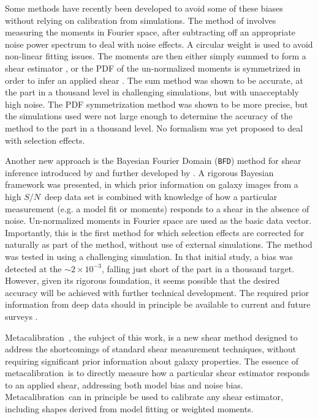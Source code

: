 \documentclass[iop]{emulateapj}
\newcommand{\snr}{$S/N$}
\newcommand{\mcal}{metacalibration}
\newcommand{\Mcal}{Metacalibration}
\newcommand{\bfd}{\texttt{BFD}}
\begin{document}
Some methods have recently been developed to avoid some of these biases without
relying on calibration from simulations.  The method of \citep{Zhang2017}
involves measuring the moments in Fourier space, after subtracting off an
appropriate noise power spectrum to deal with noise effects.  A circular weight
is used to avoid non-linear fitting issues.  The moments are then either simply
summed to form a shear estimator \citep{Zhang2015}, or the PDF of the
un-normalized moments is symmetrized in order to infer an applied shear
\citep{Zhang2017}.  The sum method was shown to be accurate, at the part in a
thousand level in challenging simulations, but with unacceptably high noise.
The PDF symmetrization method was shown to be more precise, but the simulations
used were not large enough to determine the accuracy of the method to the part
in a thousand level.  No formalism was yet proposed to deal with selection
effects. 

Another new approach is the Bayesian Fourier Domain (\bfd) method for shear
inference introduced by \cite{ba14} and further developed by \cite{bfd2016}.  A
rigorous Bayesian framework was presented, in which prior information on galaxy
images from a high \snr\ deep data set is combined with knowledge of how a
particular measurement (e.g. a model fit or moments) responds to a shear in the
absence of noise.  Un-normalized moments in Fourier space are used as the basic
data vector.  Importantly, this is the first method for which selection effects
are corrected for naturally as part of the method, without use of external
simulations.  The method was tested in \cite{bfd2016} using a challenging
simulation.  In that initial study, a bias was detected at the $\sim 2 \times
10^{-3}$, falling just short of the part in a thousand target.  However, given
its rigorous foundation, it seems possible that the desired accuracy will be
achieved with further technical development.  The required prior information
from deep data should in principle be available to current and future surveys
\citep{DESWhitePaper,TakadaHSC2010,IvezicLSST08,Euclid2011,SpergelWFIRST2015}.



\Mcal\ \citep{HuffMcal}, the subject of this work, is a new shear
method designed to address the shortcomings of standard shear measurement
techniques, without requiring significant prior information about galaxy
properties.  The essence of \mcal\ is to directly measure how a particular
shear estimator responds to an applied shear, addressing both model bias and
noise bias.  \Mcal\ can in principle be used to calibrate any shear
estimator, including shapes derived from model fitting or weighted moments.
\end{document}

